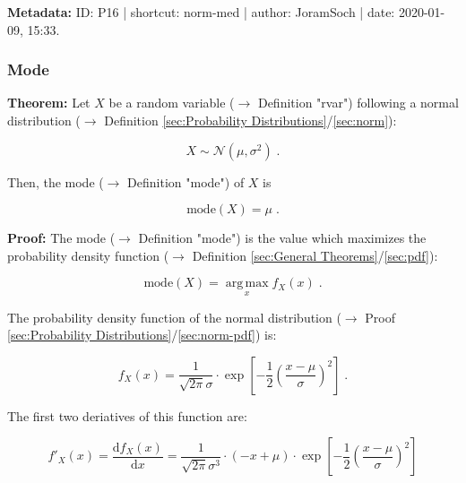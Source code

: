 \documentclass[a4paper,12pt]{book}
\begin{document}
\vspace{1em}
\textbf{Metadata:} ID: P16 | shortcut: norm-med | author: JoramSoch | date: 2020-01-09, 15:33.


\subsubsection[\textbf{Mode}]{Mode} \label{sec:norm-mode}

\vspace{1em}
\textbf{Theorem:} Let $X$ be a random variable ($\rightarrow$ Definition "rvar") following a normal distribution ($\rightarrow$ Definition \ref{sec:Probability Distributions}/\ref{sec:norm}):

\begin{equation} \label{eq:norm-mode-norm}
X \sim \mathcal{N}(\mu, \sigma^2) \; .
\end{equation}

Then, the mode ($\rightarrow$ Definition "mode") of $X$ is

\begin{equation} \label{eq:norm-mode-norm-mode}
\mathrm{mode}(X) = \mu \; .
\end{equation}


\vspace{1em}
\textbf{Proof:} The mode ($\rightarrow$ Definition "mode") is the value which maximizes the probability density function ($\rightarrow$ Definition \ref{sec:General Theorems}/\ref{sec:pdf}):

\begin{equation} \label{eq:norm-mode-mode}
\mathrm{mode}(X) = \operatorname*{arg\,max}_x f_X(x) \; .
\end{equation}

The probability density function of the normal distribution ($\rightarrow$ Proof \ref{sec:Probability Distributions}/\ref{sec:norm-pdf}) is:

\begin{equation} \label{eq:norm-mode-norm-pdf}
f_X(x) = \frac{1}{\sqrt{2 \pi} \sigma} \cdot \exp \left[ -\frac{1}{2} \left( \frac{x-\mu}{\sigma} \right)^2 \right] \; .
\end{equation}

The first two deriatives of this function are:

\begin{equation} \label{eq:norm-mode-norm-pdf-der1}
f'_X(x) = \frac{\mathrm{d}f_X(x)}{\mathrm{d}x} = \frac{1}{\sqrt{2 \pi} \sigma^3} \cdot (-x + \mu) \cdot \exp \left[ -\frac{1}{2} \left( \frac{x-\mu}{\sigma} \right)^2 \right]
\end{equation}
\end{document}
